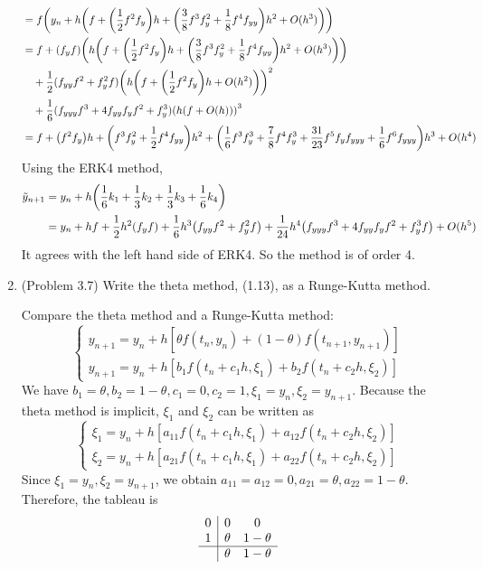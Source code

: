 \documentclass[10pt]{report}
\DeclarePairedDelimiter\autoparen{(}{)}
\newcommand{\pa}[1]{\autoparen*{#1}}
\begin{document}
\begin{enumerate}
\begin{align*}
		&= f\pa{y_n + h\pa{f+ \pa{\frac{1}{2}f^2 f_y}h + \pa{\frac{3}{8} f^3 f_y^2 + \frac{1}{8}f^4 f_{yy}}h^2 + O(h^3)}}\\
		&= f + (f_yf)\pa{h\pa{f+ \pa{\frac{1}{2}f^2 f_y}h + \pa{\frac{3}{8} f^3 f_y^2 + \frac{1}{8}f^4 f_{yy}}h^2 + O(h^3)}}\\
		&\quad+ \frac{1}{2}(f_{yy} f^2 + f_y^2 f) \pa{h\pa{f+ \pa{\frac{1}{2}f^2 f_y}h + O(h^2)}}^2\\
		&\quad+ \frac{1}{6}(f_{yyy}f^3 + 4f_{yy} f_y f^2 + f_y^3) \pa{h\pa{f+ O(h)}}^3\\
		&= f + \pa{f^2 f_y} h + \pa{f^3 f_y^2 + \frac{1}{2}f^4 f_{yy}}h^2 + \pa{\frac{1}{6}f^3 f_y^3 + \frac{7}{8}f^4 f_y^3 + \frac{31}{23}f^5 f_y f_{yyy} + \frac{1}{6}f^6 f_{yyy}}h^3 + O(h^4)
	\end{align*}
	Using the ERK4 method,
	\begin{align*}
		\tilde{y}_{n+1}
		&= y_n + h\pa{\frac{1}{6}k_1 + \frac{1}{3}k_2 + \frac{1}{3}k_3 + \frac{1}{6}k_4}\\
		&= y_n + hf + \frac{1}{2}h^2\pa{f_y f} + \frac{1}{6}h^3\pa{f_{yy} f^2 + f_y^2 f} + \frac{1}{24}h^4\pa{f_{yyy}f^3 + 4f_{yy} f_y f^2 + f_y^3 f} + O(h^5)
	\end{align*}
	It agrees with the left hand side of ERK4. So the method is of order 4.
	
	\item 
	(Problem 3.7) Write the theta method, (1.13), as a Runge-Kutta method.
	
	Compare the theta method and a Runge-Kutta method:
	\[
	\begin{cases}
		y_{n+1} = y_n + h[\theta f(t_n, y_n) + (1-\theta) f(t_{n+1}, y_{n+1})]\\
		y_{n+1} = y_n + h[b_1 f(t_n + c_1 h, \xi_1) + b_2 f(t_n + c_2 h, \xi_2)]
	\end{cases}
	\]
	We have $b_1 = \theta, b_2 = 1-\theta, c_1 = 0, c_2 = 1, \xi_1 = y_n, \xi_2 = y_{n+1}$. Because the theta method is implicit, $\xi_1$ and $\xi_2$ can be written as
	\[
	\begin{cases}
		\xi_1 = y_n + h[a_{11} f(t_n+c_1h, \xi_1) + a_{12} f(t_n+c_2h, \xi_2)]\\
		\xi_2 = y_n + h[a_{21} f(t_n+c_1h, \xi_1) + a_{22} f(t_n+c_2h, \xi_2)]
	\end{cases}
	\]
	Since $\xi_1 = y_n, \xi_2 = y_{n+1}$, we obtain $a_{11} = a_{12} = 0, a_{21} = \theta, a_{22} = 1-\theta$. Therefore, the tableau is
	\[
	\begin{array}{c|cc}
	0 & 0 & 0\\
	1 & \theta & 1-\theta\\ \hline
	& \theta & 1-\theta
	\end{array}
	\]
\end{enumerate}
\end{document}
